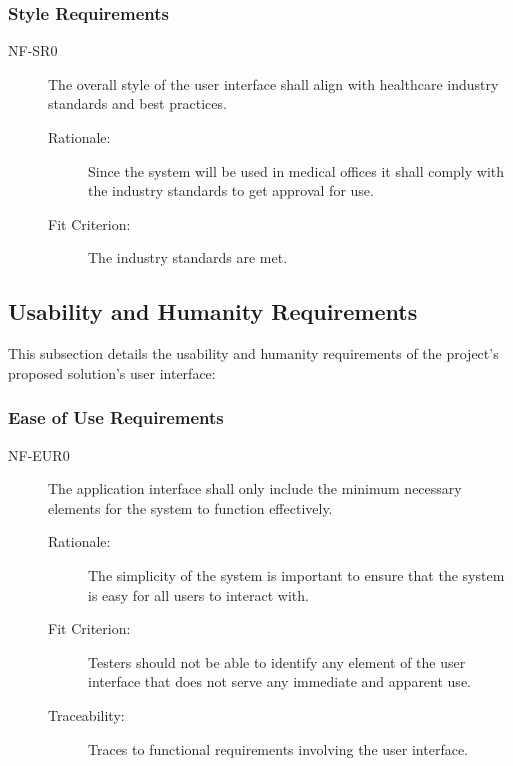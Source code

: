 \documentclass[12pt]{article}
\begin{document}
\subsubsection{Style Requirements}
\begin{description}
    \item[NF-SR0] The overall style of the user interface shall align with healthcare industry standards and best practices. 
    \begin{description}
        \item[Rationale:] Since the system will be used in medical offices it shall comply with the industry standards to get approval for use.
        \item[Fit Criterion:] The industry standards are met.
    \end{description}
\end{description}

\subsection{Usability and Humanity Requirements}
This subsection details the usability and humanity requirements of the project's proposed solution's user interface:

\subsubsection{Ease of Use Requirements}
\begin{description}
    \item[NF-EUR0] The application interface shall only include the minimum necessary elements for the system to function effectively.
    \begin{description}
        \item[Rationale:] The simplicity of the system is important to ensure that the system is easy for all users to interact with.
        \item[Fit Criterion:] Testers should not be able to identify any element of the user interface that does not serve any immediate and apparent use.
        \item[Traceability:] Traces to functional requirements involving the user interface.
    \end{description}
\end{description}
\end{document}
